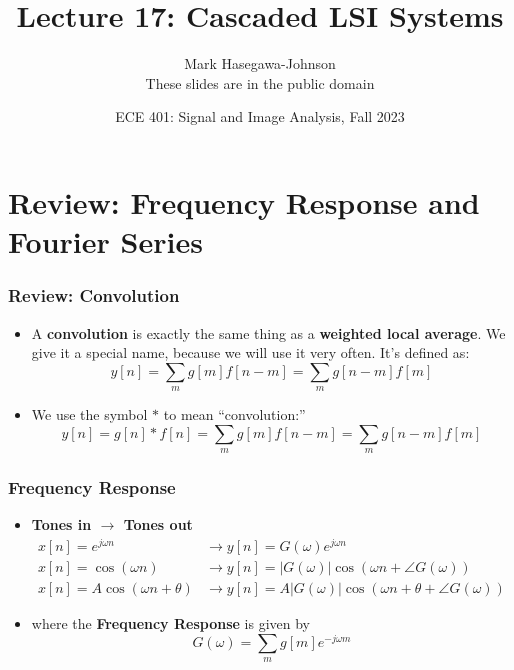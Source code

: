 \documentclass{beamer}
\title{Lecture 17: Cascaded LSI Systems}
\author{Mark Hasegawa-Johnson\\These slides are in the public domain}
\date{ECE 401: Signal and Image Analysis, Fall 2023}
\begin{document}
\begin{frame}
  \maketitle
\end{frame}

\begin{frame}
  \tableofcontents
\end{frame}

\section[Review]{Review: Frequency Response and Fourier Series}
\setcounter{subsection}{1}

\begin{frame}
  \frametitle{Review: Convolution}
  \begin{itemize}
  \item A {\bf convolution} is exactly the same thing as a {\bf weighted local average}.
    We give it a special name, because we will use it very often.  It's defined as:
    \[
    y[n] = \sum_m g[m] f[n-m] = \sum_m g[n-m] f[m]
    \]
  \item 
    We use the symbol $\ast$ to mean ``convolution:''
    \[
    y[n]=g[n]\ast f[n] = \sum_m g[m] f[n-m] = \sum_m g[n-m] f[m]
    \]
  \end{itemize}
\end{frame}

\begin{frame}
  \frametitle{Frequency Response}
  \begin{itemize}
  \item {\bf Tones in $\rightarrow$ Tones out}
    \begin{align*}
      x[n]=e^{j\omega n} &\rightarrow y[n]=G(\omega)e^{j\omega n}\\
      x[n]=\cos\left(\omega n\right)
      &\rightarrow y[n]=|G(\omega)|\cos\left(\omega n+\angle G(\omega)\right)\\
      x[n]=A\cos\left(\omega n+\theta\right)
      &\rightarrow y[n]=A|G(\omega)|\cos\left(\omega n+\theta+\angle G(\omega)\right)
    \end{align*}
  \item where the {\bf Frequency Response} is given by
    \[
    G(\omega) = \sum_m g[m]e^{-j\omega m}
    \]
  \end{itemize}
\end{frame}
\end{document}
